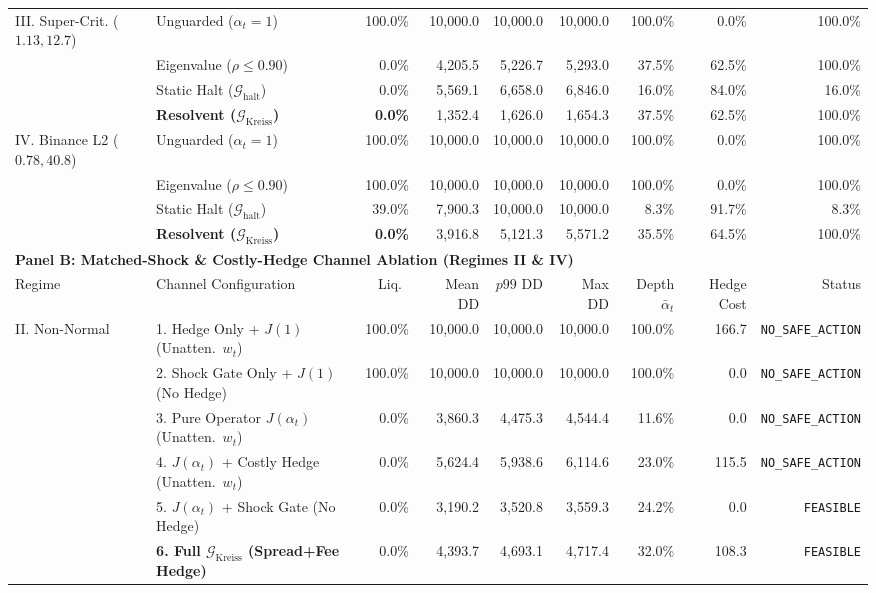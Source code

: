 \begin{table}[htbp]
{\begin{tabular}{llrrrrrrr}
\midrule
III. Super-Crit. ($1.13, 12.7$) & Unguarded ($\alpha_t=1$) & 100.0\% & 10,000.0 & 10,000.0 & 10,000.0 & 100.0\% & 0.0\% & 100.0\% \\
 & Eigenvalue ($\rho \le 0.90$) & 0.0\% & 4,205.5 & 5,226.7 & 5,293.0 & 37.5\% & 62.5\% & 100.0\% \\
 & Static Halt ($\mathcal{G}_{\mathrm{halt}}$) & 0.0\% & 5,569.1 & 6,658.0 & 6,846.0 & 16.0\% & 84.0\% & 16.0\% \\
 & \textbf{Resolvent ($\mathcal{G}_{\mathrm{Kreiss}}$)} & \textbf{0.0\%} & 1,352.4 & 1,626.0 & 1,654.3 & 37.5\% & 62.5\% & 100.0\% \\
\midrule
IV. Binance L2 ($0.78, 40.8$) & Unguarded ($\alpha_t=1$) & 100.0\% & 10,000.0 & 10,000.0 & 10,000.0 & 100.0\% & 0.0\% & 100.0\% \\
 & Eigenvalue ($\rho \le 0.90$) & 100.0\% & 10,000.0 & 10,000.0 & 10,000.0 & 100.0\% & 0.0\% & 100.0\% \\
 & Static Halt ($\mathcal{G}_{\mathrm{halt}}$) & 39.0\% & 7,900.3 & 10,000.0 & 10,000.0 & 8.3\% & 91.7\% & 8.3\% \\
 & \textbf{Resolvent ($\mathcal{G}_{\mathrm{Kreiss}}$)} & \textbf{0.0\%} & 3,916.8 & 5,121.3 & 5,571.2 & 35.5\% & 64.5\% & 100.0\% \\
\midrule
\multicolumn{9}{l}{\textbf{Panel B: Matched-Shock \& Costly-Hedge Channel Ablation (Regimes II \& IV)}} \\
\midrule
Regime & Channel Configuration & Liq.\ & Mean DD & $p99$ DD & Max DD & Depth $\bar{\alpha}_t$ & Hedge Cost & Status \\
\midrule
II. Non-Normal & 1. Hedge Only + $J(1)$ (Unatten.\ $w_t$) & 100.0\% & 10,000.0 & 10,000.0 & 10,000.0 & 100.0\% & 166.7 & \texttt{NO\_SAFE\_ACTION} \\
 & 2. Shock Gate Only + $J(1)$ (No Hedge) & 100.0\% & 10,000.0 & 10,000.0 & 10,000.0 & 100.0\% & 0.0 & \texttt{NO\_SAFE\_ACTION} \\
 & 3. Pure Operator $J(\alpha_t)$ (Unatten.\ $w_t$) & 0.0\% & 3,860.3 & 4,475.3 & 4,544.4 & 11.6\% & 0.0 & \texttt{NO\_SAFE\_ACTION} \\
 & 4. $J(\alpha_t)$ + Costly Hedge (Unatten.\ $w_t$) & 0.0\% & 5,624.4 & 5,938.6 & 6,114.6 & 23.0\% & 115.5 & \texttt{NO\_SAFE\_ACTION} \\
 & 5. $J(\alpha_t)$ + Shock Gate (No Hedge) & 0.0\% & 3,190.2 & 3,520.8 & 3,559.3 & 24.2\% & 0.0 & \texttt{FEASIBLE} \\
 & \textbf{6. Full $\mathcal{G}_{\mathrm{Kreiss}}$ (Spread+Fee Hedge)} & 0.0\% & 4,393.7 & 4,693.1 & 4,717.4 & 32.0\% & 108.3 & \texttt{FEASIBLE} \\

\end{tabular}}
\end{table}
